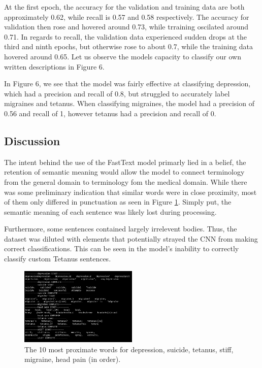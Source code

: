 \documentclass[12pt]{report}
\begin{document}
At the first epoch, the accuracy for the validation and training data are both
approximately 0.62, while recall is 0.57 and 0.58 respectively. The accuracy
for validation then rose and hovered around 0.73, while trraining oscilated
around 0.71. In regards to recall, the validation data experienced sudden drops
at the third and ninth epochs, but otherwise rose to about 0.7, while the
training data hovered around 0.65. Let us observe the models capacity to classify
our own written descriptions in Figure 6.

In Figure 6, we see that the model was fairly effective at classifying
depression, which had a precision and recall of 0.8, but struggled to accurately
label migraines and tetanus. When classifying migraines, the model had a
precision of 0.56 and recall of 1, however tetanus had a precision and recall of
0.

\subsection{Discussion}
The intent behind the use of the FastText model primarly lied in
a belief, the retention of semantic meaning would allow the
model to connect terminology from the general domain to
terminology fom the medical domain. While there was some preliminary
indication that similar words were in close proximity, most of them
only differed in punctuation as seen in Figure \ref{fig:prox-words}.
Simply put, the semantic meaning of each sentence was likely lost
during processing.

Furthermore, some sentences contained largely irrelevent bodies. Thus,
the dataset was diluted with elements that potentially strayed the CNN
from making correct classifications. This can be seen in the model's
inability to correctly classify custom Tetanus sentences.



\begin{figure}[h!]
	\centering
	\includegraphics[width=0.5\textwidth]{proximate-words.png}
	\caption{The 10 most proximate words for depression, suicide, tetanus, stiff, migraine, head pain (in order).}
	\label{fig:prox-words}
\end{figure}
\end{document}
